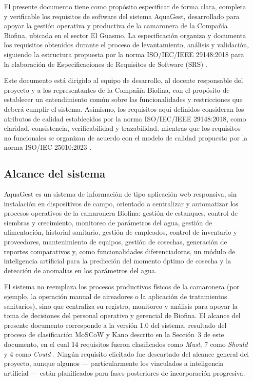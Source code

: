 \documentclass[12pt,a4paper]{article}
\begin{document}
El presente documento tiene como propósito especificar de forma clara, completa y verificable los requisitos de software del sistema AquaGest, desarrollado para apoyar la gestión operativa y productiva de la camaronera de la Compañía Biofina, ubicada en el sector El Guasmo. La especificación organiza y documenta los requisitos obtenidos durante el proceso de levantamiento, análisis y validación, siguiendo la estructura propuesta por la norma ISO/IEC/IEEE 29148:2018 para la elaboración de Especificaciones de Requisitos de Software (SRS) \cite{ISO29148:2018}.

Este documento está dirigido al equipo de desarrollo, al docente responsable del proyecto y a los representantes de la Compañía Biofina, con el propósito de establecer un entendimiento común sobre las funcionalidades y restricciones que deberá cumplir el sistema. Asimismo, los requisitos aquí definidos consideran los atributos de calidad establecidos por la norma ISO/IEC/IEEE 29148:2018, como claridad, consistencia, verificabilidad y trazabilidad, mientras que los requisitos no funcionales se organizan de acuerdo con el modelo de calidad propuesto por la norma ISO/IEC 25010:2023 \cite{ISO25010:2023}.

\subsection{Alcance del sistema}

AquaGest es un sistema de información de tipo aplicación web responsiva, sin
instalación en dispositivos de campo, orientado a centralizar y automatizar los
procesos operativos de la camaronera Biofina: gestión de estanques, control de
siembras y crecimiento, monitoreo de parámetros del agua, gestión de
alimentación, historial sanitario, gestión de empleados, control de inventario
y proveedores, mantenimiento de equipos, gestión de cosechas, generación de
reportes comparativos y, como funcionalidades diferenciadoras, un módulo de
inteligencia artificial para la predicción del momento óptimo de cosecha y la
detección de anomalías en los parámetros del agua.

El sistema no reemplaza los procesos productivos físicos de la camaronera (por
ejemplo, la operación manual de aireadores o la aplicación de tratamientos
sanitarios), sino que centraliza su registro, monitoreo y análisis para apoyar
la toma de decisiones del personal operativo y gerencial de Biofina. El alcance
del presente documento corresponde a la versión 1.0 del sistema, resultado del
proceso de clasificación MoSCoW y Kano descrito en la Sección~3 de este
documento, en el cual 14 requisitos fueron clasificados como \textit{Must},
7 como \textit{Should} y 4 como \textit{Could} \cite{Kravchenko2022,Pohl2010}.
Ningún requisito elicitado fue descartado del alcance general del proyecto,
aunque algunos --- particularmente los vinculados a inteligencia artificial ---
están planificados para fases posteriores de incorporación progresiva.
\end{document}
